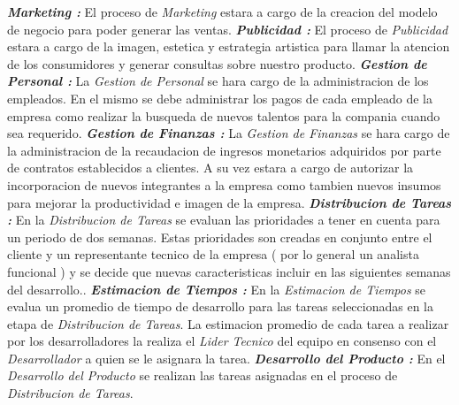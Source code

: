 \documentclass[
10pt, %
a4paper, %
oneside, %
headinclude,footinclude, %
BCOR5mm, %
]{scrartcl}
\begin{document}
  \textbf{ \emph{Marketing : } } El proceso de \textit{Marketing} estara
  a cargo de la creacion del modelo de negocio para poder generar las ventas.
   \newline \newline
  \textbf{ \emph{Publicidad : } } El proceso de \textit{Publicidad} estara
  a cargo de la imagen, estetica y estrategia artistica para llamar la atencion
  de los consumidores y generar consultas sobre nuestro producto.
   \newline \newline
  \textbf{ \emph{Gestion de Personal : } } La \textit{Gestion de Personal}
  se hara cargo de la administracion de los empleados. En el mismo se debe
  administrar los pagos de cada empleado de la empresa como realizar la busqueda
  de nuevos talentos para la compania cuando sea requerido.
   \newline \newline
  \textbf{ \emph{Gestion de Finanzas : } } La \textit{Gestion  de Finanzas} se
   hara cargo de la administracion de la recaudacion de ingresos monetarios
   adquiridos por parte de contratos establecidos a clientes. A su vez
   estara a cargo de autorizar la incorporacion de nuevos integrantes a la
   empresa como tambien nuevos insumos para mejorar la productividad e
   imagen de la empresa.
  \newline  \newline
  \textbf{ \emph{Distribucion de Tareas : } } En la \textit{Distribucion de Tareas}
  se evaluan las prioridades a tener en cuenta para un periodo de dos semanas.
  Estas prioridades son creadas en conjunto entre el cliente y un representante
  tecnico de la empresa ( por lo general un analista funcional ) y se decide
  que nuevas caracteristicas incluir en las siguientes semanas del desarrollo..
  \newline  \newline
  \textbf{ \emph{Estimacion de Tiempos : } } En la \textit{Estimacion de Tiempos}
  se evalua un promedio de tiempo de desarrollo  para las tareas seleccionadas
  en la etapa de \textit{Distribucion de Tareas}. La estimacion promedio de
  cada  tarea a realizar por los desarrolladores la realiza el
  \textit{Lider Tecnico} del equipo en consenso con el \textit{Desarrollador}
  a quien se le asignara la tarea.
  \newline  \newline
  \textbf{ \emph{Desarrollo del Producto : } } En el \textit{Desarrollo del Producto}
  se realizan las tareas asignadas en el proceso de \textit{Distribucion de Tareas}.
\end{document}
